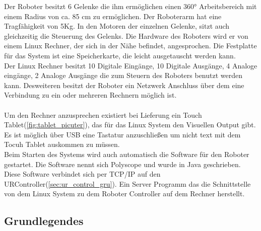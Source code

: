 Der Roboter besitzt 6 Gelenke die ihm ermöglichen einen 360° Arbeitsbereich mit einem Radius von ca. 85 cm zu ermöglichen. Der Roboterarm hat eine Tragfähigkeit von 5Kg. In den Motoren der einzelnen Gelenke, sitzt auch gleichzeitig die Steuerung des Gelenks. Die Hardware des Roboters wird er von einem Linux Rechner, der sich in der Nähe befindet, angesprochen.
Die Festplatte für das System ist eine Speicherkarte, die leicht ausgetauscht werden kann.\\
Der Linux Rechner besitzt 10 Digitale Eingänge, 10 Digitale Ausgänge, 4 Analoge eingänge, 2 Analoge Ausgänge die zum Steuern des Roboters benutzt werden kann. Desweiteren besitzt der Roboter ein Netzwerk Anschluss über dem eine Verbindung zu ein oder mehreren Rechnern möglich ist.
\\\\
Um den Rechner anzusprechen existiert bei Lieferung ein Touch Tablet(\ref{fig:tablet_picuter}), das für das Linux System den Visuellen Output gibt. Es ist möglich über \ac{USB} eine Tastatur anzuschließen um nicht text mit dem Tocuh Tablet auskommen zu müssen. 
\\
Beim Starten des Systems wird auch automatisch die Software für den Roboter gestartet. Die Software nennt sich Polyscope und wurde in Java geschrieben. Diese Software verbindet sich per \ac{TCP/IP} auf den URController(\ref{sec:ur_control_gru}). Ein Server Programm das die Schnittstelle von dem Linux System zu dem Roboter Controller auf dem Rechner herstellt.

\subsection{Grundlegendes}
\label{sub:ur_update_gru}

